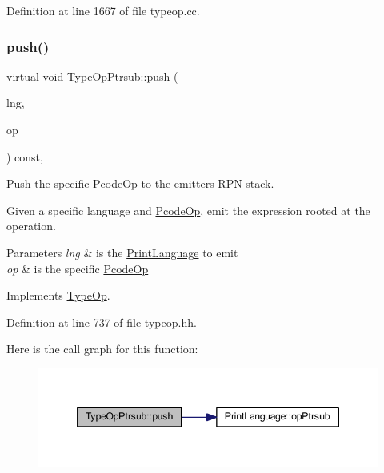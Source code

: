 Definition at line 1667 of file typeop.\+cc.

\mbox{\label{class_type_op_ptrsub_a95674038c09fc5df8df3a3e743975cd9}} 
\subsubsection{\texorpdfstring{push()}{push()}}
{\footnotesize\ttfamily virtual void Type\+Op\+Ptrsub\+::push (\begin{DoxyParamCaption}\item[{\mbox{\hyperlink{class_print_language}{Print\+Language}} $\ast$}]{lng,  }\item[{const \mbox{\hyperlink{class_pcode_op}{Pcode\+Op}} $\ast$}]{op }\end{DoxyParamCaption}) const\hspace{0.3cm}{\ttfamily [inline]}, {\ttfamily [virtual]}}



Push the specific \mbox{\hyperlink{class_pcode_op}{Pcode\+Op}} to the emitter\textquotesingle{}s R\+PN stack. 

Given a specific language and \mbox{\hyperlink{class_pcode_op}{Pcode\+Op}}, emit the expression rooted at the operation. 
\begin{DoxyParams}{Parameters}
{\em lng} & is the \mbox{\hyperlink{class_print_language}{Print\+Language}} to emit \\
\hline
{\em op} & is the specific \mbox{\hyperlink{class_pcode_op}{Pcode\+Op}} \\
\hline
\end{DoxyParams}


Implements \mbox{\hyperlink{class_type_op_ac9c9544203ed74dabe6ac662b653b2af}{Type\+Op}}.



Definition at line 737 of file typeop.\+hh.

Here is the call graph for this function\+:
\nopagebreak
\begin{figure}[H]
\begin{center}
\leavevmode
\includegraphics[width=346pt]{class_type_op_ptrsub_a95674038c09fc5df8df3a3e743975cd9_cgraph}
\end{center}
\end{figure}


